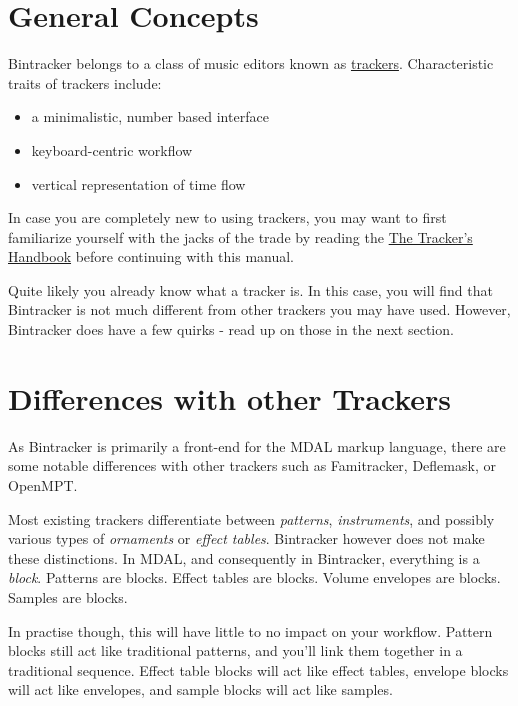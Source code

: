 \documentclass[12pt]{report}	%
\begin{document}
\section{General Concepts}

Bintracker belongs to a class of music editors known as \href{https://en.wikipedia.org/wiki/Tracker_\%28music_software\%29}{trackers}. Characteristic traits of trackers include:

\begin{itemize}
\item a minimalistic, number based interface
\item keyboard-centric workflow
\item vertical representation of time flow
\end{itemize}

In case you are completely new to using trackers, you may want to first familiarize yourself with the jacks of the trade by reading the \href{http://resources.openmpt.org/tracker_handbook/handbook.htm}{The Tracker's Handbook} before continuing with this manual.

Quite likely you already know what a tracker is. In this case, you will find that Bintracker is not much different from other trackers you may have used. However, Bintracker does have a few quirks - read up on those in the next section.



\section{Differences with other Trackers}

As Bintracker is primarily a front-end for the MDAL markup language, there are some notable differences with other trackers such as Famitracker, Deflemask, or OpenMPT.

Most existing trackers differentiate between \textit{patterns}, \textit{instruments}, and possibly various types of \textit{ornaments} or \textit{effect tables}. Bintracker however does not make these distinctions. In MDAL, and consequently in Bintracker, everything is a \textit{block}. Patterns are blocks. Effect tables are blocks. Volume envelopes are blocks. Samples are blocks. 

In practise though, this will have little to no impact on your workflow. Pattern blocks still act like traditional patterns, and you'll link them together in a traditional sequence. Effect table blocks will act like effect tables, envelope blocks will act like envelopes, and sample blocks will act like samples.
\end{document}
